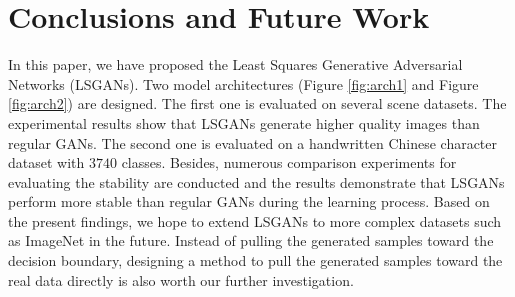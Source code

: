 \documentclass{article} %
\begin{document}
\section{Conclusions and Future Work}
\label{sec:conclusion}
In this paper, we have proposed the Least Squares Generative Adversarial Networks (LSGANs). Two model architectures (Figure \ref{fig:arch1} and Figure \ref{fig:arch2}) are designed. The first one is evaluated on several scene datasets. The experimental results show that LSGANs generate higher quality images than regular GANs. The second one is evaluated on a handwritten Chinese character dataset with $3740$ classes. Besides, numerous comparison experiments for evaluating the stability are conducted and the results demonstrate that LSGANs perform more stable than regular GANs during the learning process. Based on the present findings, we hope to extend LSGANs to more complex datasets such as ImageNet in the future. Instead of pulling the generated samples toward the decision boundary, designing a method to pull the generated samples toward the real data directly is also worth our further investigation.



\end{document}

